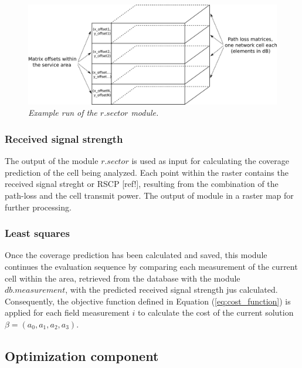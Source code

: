 \begin{figure}
\centering

\includegraphics[width=1\textwidth]{05-framework_parameter_tuning/img/pathloss_matrices}

\caption{\textit{Example run of the $r.sector$ module.\label{fig:r_sector_example}}}
\end{figure}



\subsubsection{Received signal strength}

The output of the module $r.sector$ is used as input for calculating
the coverage prediction of the cell being analyzed. Each point within
the raster contains the received signal streght or RSCP {[}ref!{]},
resulting from the combination of the path-loss and the cell transmit
power. The output of module in a raster map for further processing.


\subsubsection{Least squares}

Once the coverage prediction has been calculated and saved, this module
continues the evaluation sequence by comparing each measurement of
the current cell within the area, retrieved from the database with
the module $db.measurement$, with the predicted received signal strength
jus calculated. Consequently, the objective function defined in Equation
(\ref{eq:cost_function}) is applied for each field measurement $i$
to calculate the cost of the current solution $\beta=(a_{0},a_{1},a_{2},a_{3})$.


\subsection{Optimization component}


